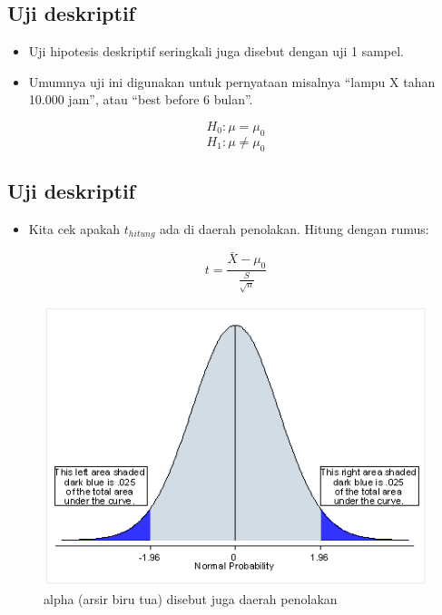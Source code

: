 \documentclass[
  letterpaper,
  DIV=11,
  numbers=noendperiod]{scrartcl}
\providecommand{\tightlist}{%
  \setlength{\itemsep}{0pt}\setlength{\parskip}{0pt}}\usepackage{longtable,booktabs,array}
\begin{document}
\subsection{Uji deskriptif}\label{uji-deskriptif}

\begin{itemize}
\item
  Uji hipotesis deskriptif seringkali juga disebut dengan uji 1 sampel.
\item
  Umumnya uji ini digunakan untuk pernyataan misalnya ``lampu X tahan
  10.000 jam'', atau ``best before 6 bulan''.
\end{itemize}

\[
H_0: \mu = \mu_0
\] \[
H_1: \mu \neq \mu_0
\]

\subsection{Uji deskriptif}\label{uji-deskriptif-1}

\begin{itemize}
\tightlist
\item
  Kita cek apakah \(t_{hitung}\) ada di daerah penolakan. Hitung dengan
  rumus:
\end{itemize}

\[
t=\frac{\bar{X}-\mu_0}{\frac{S}{\sqrt{n}}}
\]

\begin{figure}[H]

{\centering \includegraphics{pvalue1.gif}

}

\caption{alpha (arsir biru tua) disebut juga daerah penolakan}

\end{figure}%
\end{document}
